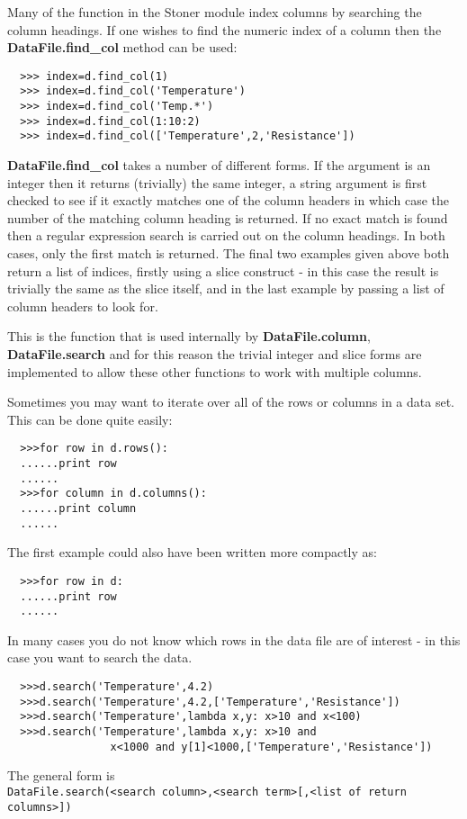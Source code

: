 \documentclass[a4paper,11pt]{scrartcl}
\begin{document}
Many of the function in the Stoner module index columns by searching the column headings. If one wishes to find the numeric index of a column then the \textbf{DataFile.find\_col} method can be used:

\begin{verbatim}
  >>> index=d.find_col(1)
  >>> index=d.find_col('Temperature')
  >>> index=d.find_col('Temp.*')
  >>> index=d.find_col(1:10:2)
  >>> index=d.find_col(['Temperature',2,'Resistance'])
\end{verbatim}

 \textbf{DataFile.find\_col} takes a number of different forms. If the argument is an integer then it returns (trivially) the same integer, a string argument is first checked to see if it exactly matches one of the column headers in which case the number of the matching column heading is returned. If no exact match is found then a regular expression search is carried out on the column headings. In both cases, only the first match is returned. The final two examples given above both return a list of indices, firstly using a slice construct - in this case the result is trivially the same as the slice itself, and in the last example by passing a list of column headers to look for.

This is the function that is used internally by \textbf{DataFile.column}, \textbf{DataFile.search} \etc and for this reason the trivial integer and slice forms are implemented to allow these other functions to work with multiple columns.

Sometimes you may want to iterate over all of the rows or columns in a data set. This can be done quite easily:
\begin{verbatim}
  >>>for row in d.rows():
  ......print row
  ......
  >>>for column in d.columns():
  ......print column
  ......
\end{verbatim}
The first example could also have been written more compactly as:
\begin{verbatim}
  >>>for row in d:
  ......print row
  ......
\end{verbatim}

In many cases you do not know which rows in the data file are of interest - in this case you want to search the data.
\begin{verbatim}
  >>>d.search('Temperature',4.2)
  >>>d.search('Temperature',4.2,['Temperature','Resistance'])
  >>>d.search('Temperature',lambda x,y: x>10 and x<100)
  >>>d.search('Temperature',lambda x,y: x>10 and
                x<1000 and y[1]<1000,['Temperature','Resistance'])
\end{verbatim}
The general form is \\\verb:DataFile.search(<search column>,<search term>[,<list of return columns>]):
\end{document}
